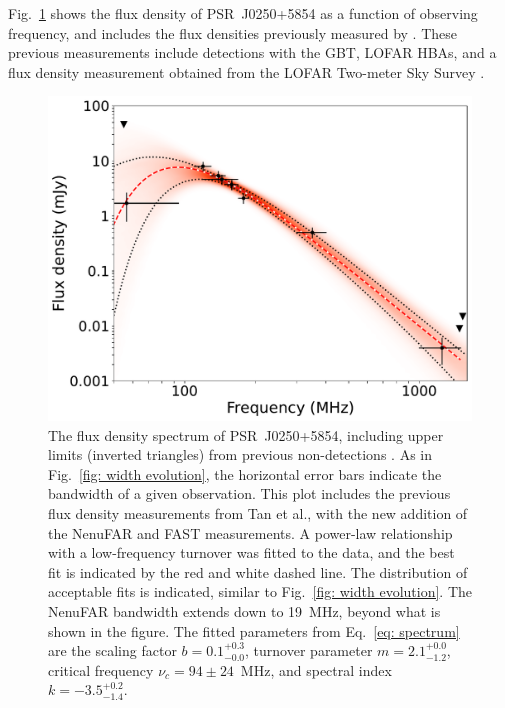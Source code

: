 Fig.~\ref{fig: spectrum} shows the flux density of PSR~J0250+5854 as a function of observing frequency, and includes the flux densities previously measured by \citet{TBC+2018}. These previous measurements include detections with the GBT, LOFAR HBAs, and a flux density measurement obtained from the LOFAR Two-meter Sky Survey \citep[LoTSS;][]{SRB+2017}. 
\begin{figure}
    \includegraphics[width=\columnwidth]{Figures/J0250/spectral_index_turnover}
    \caption[Radio spectrum of PSR~J0250+5854]{The flux density spectrum of PSR~J0250+5854, including upper limits (inverted triangles) from previous non-detections \citep{TBC+2018}. As in Fig.~\ref{fig: width evolution}, the horizontal error bars indicate the bandwidth of a given observation. This plot includes the previous flux density measurements from Tan et al., with the new addition of the NenuFAR and FAST measurements. A power-law relationship with a low-frequency turnover was fitted to the data, and the best fit is indicated by the red and white dashed line. The distribution of acceptable fits is indicated, similar to Fig.~\ref{fig: width evolution}. The NenuFAR bandwidth extends down to 19~MHz, beyond what is shown in the figure. The fitted parameters from Eq.~\eqref{eq: spectrum} are the scaling factor $b = 0.1^{+0.3}_{-0.0}$, turnover parameter $m = 2.1^{+0.0}_{-1.2}$, critical frequency $\nu_c = 94\pm24$~MHz, and spectral index $k = -3.5^{+0.2}_{-1.4}$.}
    \label{fig: spectrum}
\end{figure}
